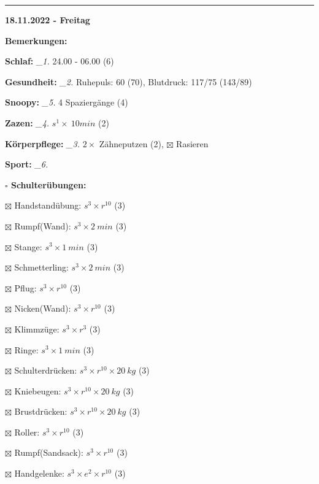 \documentclass[10pt,a4paper]{article}
\newcommand\prop[1] {{\color {alizarin} {\bf #1}}}             %
\newcommand\rele[1] {{\color {english} \bf {#1}}}              %
\newcommand\mand[1] {{\color {burntorange} {\bf #1}}}          %
\newcommand\ddivide {\vskip -9pt \hrule \vskip 6pt}
\newcommand\topspace{\vskip -15pt \hskip 20pt}
\newcommand\n[1] { {\sl #1.} \hskip 5pt }
\begin{document}
\ddivide
{\rele {18.11.2022 - Freitag}}

\begin{mdframed}[style=daystyle]
  \begin{labeling}{{\mand {Bemerkungen:}}}
    \setlength\itemsep{-3pt}
  \item[{\mand {Schlaf:}}]        \n{\_1} 24.00 - 06.00 (6)
  \item[{\mand {Gesundheit:}}]    \n{\_2} Ruhepuls: 60 (70), Blutdruck: 117/75 (143/89)
  \item[{\mand {Snoopy:}}]        \n{\_5} 4 Spaziergänge (4)
  \item[{\mand {Zazen:}}]         \n{\_4} $s^1 \times\ 10 min$ (2)
  \item[{\mand {Körperpflege:}}]  \n{\_3} $2 \times$ Zähneputzen (2), $\boxtimes$ Rasieren
  \item[{\mand {Sport:}}]         \n{\_6}
    \topspace
    \begin{minipage}{0.75\textwidth}  
      \begin{labeling}{\prop {$\square$ {Schulterübungen:}}} 
        \setlength\itemsep{-3pt}
      \item[$\boxtimes$ Handstandübung:]  $s^3 \times r^{10}$ (3)
      \item[$\boxtimes$ Rumpf(Wand):]     $s^3 \times 2\ min$ (3)
      \item[$\boxtimes$ Stange:]          $s^3 \times 1\ min$ (3)
      \item[$\boxtimes$ Schmetterling:]   $s^3 \times 2\ min$ (3)
      \item[$\boxtimes$ Pflug:]           $s^3 \times r^{10}$ (3)
      \item[$\boxtimes$ Nicken(Wand):]    $s^3 \times r^{10}$ (3)
      \item[$\boxtimes$ Klimmzüge:]       $s^3 \times r^3$ (3)
      \item[$\boxtimes$ Ringe:]           $s^3 \times 1\ min$ (3)
      \item[$\boxtimes$ Schulterdrücken:] $s^3 \times r^{10} \times 20\ kg$ (3)
      \item[$\boxtimes$ Kniebeugen:]      $s^3 \times r^{10} \times 20\ kg$ (3)
      \item[$\boxtimes$ Brustdrücken:]    $s^3 \times r^{10} \times 20\ kg$ (3)
      \item[$\boxtimes$ Roller:]          $s^3 \times r^{10}$ (3)
      \item[$\boxtimes$ Rumpf(Sandsack):] $s^3 \times r^{10}$ (3)
      \item[$\boxtimes$ Handgelenke:]     $s^3 \times e^2 \times r^{10}$ (3)

\end{labeling}
\end{minipage}
\end{labeling}
\end{mdframed}
\end{document}

